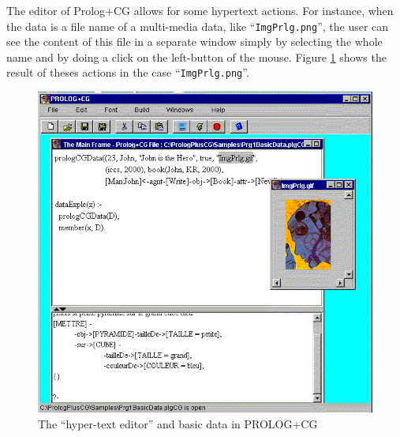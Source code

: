 \documentclass{book}
\begin{document}
The editor of Prolog+CG allows for some hypertext actions. For
instance, when the data is a file name of a multi-media data, like
``\texttt{ImgPrlg.png}'', the user can see the content of this file in
a separate window simply by selecting the whole name and by doing a
click on the left-button of the mouse. Figure \ref{HyperTextEditor}
shows the result of theses actions in the case
``\texttt{ImgPrlg.png}''.


\begin{latexonly}

\begin{figure}
\begin{center}
\includegraphics[scale=0.4]{MMDataEnv.png}
\end{center}
\caption{\label{HyperTextEditor}The ``hyper-text editor'' and basic data in PROLOG+CG}
\end{figure}

\end{latexonly}
\end{document}
